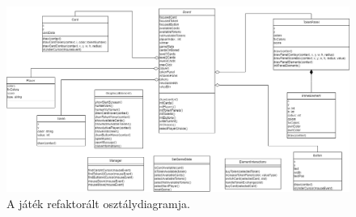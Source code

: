 \begin{figure}[h]
\centering
\includegraphics[scale=0.3]{images/refactored_UML.png}
\caption{A játék refaktorált osztálydiagramja.}
\label{fig:refactored_uml}
\end{figure}